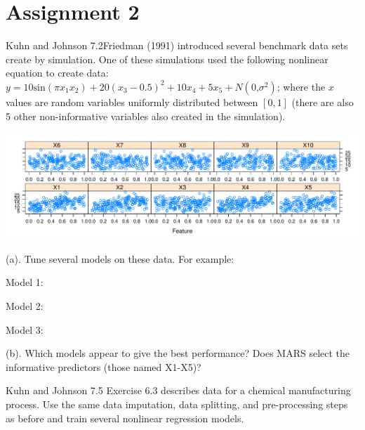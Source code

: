 \documentclass[]{report}
\begin{document}
\hypertarget{AS-2}{%
\chapter*{Assignment 2}\label{AS-2}}


\begin{question}{Kuhn and Johnson 7.2}Friedman (1991) introduced several benchmark data sets create by simulation. One of these simulations used the following nonlinear equation to create data: $y = 10\text{sin}(\pi x_1 x_2)+20(x_3-0.5)^2+10x_4+5x_5+N(0\text{,} \sigma^2)$; where the $x$ values are random variables uniformly distributed between $[0, 1]$ (there are also 5 other non-informative variables also created in the simulation). \end{question}

\includegraphics{Homework-Two_files/figure-latex/kj-7.2-ex1-1.pdf}

\begin{subquestion}{(a).} Tune several models on these data. For example: 
\end{subquestion}

Model 1:

Model 2:

Model 3:

\begin{subquestion}{(b).}
Which models appear to give the best performance? Does MARS select the informative predictors (those named X1-X5)?
\end{subquestion}


\begin{question}{Kuhn and Johnson 7.5}
Exercise 6.3 describes data for a chemical manufacturing process. Use the same data imputation, data splitting, and pre-processing steps as before and train several nonlinear regression models.
\end{question}
\end{document}
